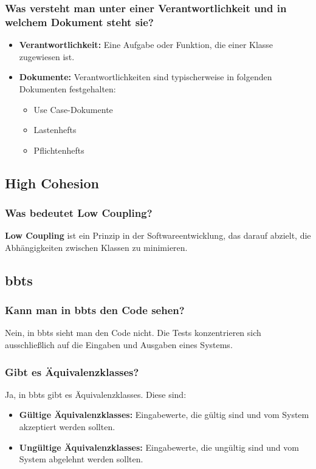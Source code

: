 \documentclass[main.tex]{subfiles}
\begin{document}
\subsubsection*{Was versteht man unter einer Verantwortlichkeit und in welchem Dokument steht sie?}
\begin{itemize}
    \item \textbf{Verantwortlichkeit:} Eine Aufgabe oder Funktion, die einer Klasse zugewiesen ist.
    \item \textbf{Dokumente:} Verantwortlichkeiten sind typischerweise in folgenden Dokumenten festgehalten:
    \begin{itemize}
        \item \gls{Use Case}-Dokumente
        \item \glspl{Lastenheft}
        \item \glspl{Pflichtenheft}
    \end{itemize}
\end{itemize}


\subsection{\gls{High Cohesion}}
\subsubsection*{Was bedeutet \gls{Low Coupling}?}
\textbf{\gls{Low Coupling}} ist ein Prinzip in der Softwareentwicklung, das darauf abzielt, die Abhängigkeiten zwischen Klassen zu minimieren. 


\subsection{\glspl{bbt}}
\subsubsection*{Kann man in \glspl{bbt} den Code sehen?}
Nein, in \glspl{bbt} sieht man den Code nicht. Die Tests konzentrieren sich ausschließlich auf die Eingaben und Ausgaben eines Systems.


\subsubsection*{Gibt es \glspl{Äquivalenzklasse}?}
Ja, in \glspl{bbt} gibt es \glspl{Äquivalenzklasse}. Diese sind:
\begin{itemize}
    \item \textbf{Gültige \glspl{Äquivalenzklasse}:} Eingabewerte, die gültig sind und vom System akzeptiert werden sollten.
    \item \textbf{Ungültige \glspl{Äquivalenzklasse}:} Eingabewerte, die ungültig sind und vom System abgelehnt werden sollten.
\end{itemize}
\end{document}
